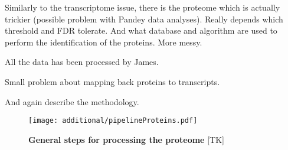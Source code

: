 Similarly to the transcriptome issue, there is the proteome which is actually
trickier (possible problem with Pandey data analyses). Really depends which
threshold and \gls{FDR} tolerate. And what database and algorithm are used to perform
the identification of the proteins. More messy.

All the data has been processed by James.

Small problem about mapping back proteins to transcripts.



And again describe the methodology.

  \begin{figure}
      \texttt{[image: additional/pipelineProteins.pdf]}\centering
      \caption[General steps for processing the proteome
      data]{\label{fig:pipelineProt}\textbf{General steps for processing the
      proteome} [TK] }
  \end{figure}


